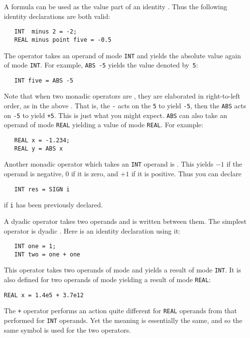 A formula can be used as the value part of an identity
.  Thus the following
identity declarations are both valid:
\begin{verbatim}
   INT  minus 2 = -2;
   REAL minus point five = -0.5
\end{verbatim}
\noindent
The operator  takes an operand of mode \verb|INT| and
yields the absolute value again of mode \verb|INT|. For example,
\verb|ABS -5| yields the value denoted by~\verb|5|:
\begin{verbatim}
   INT five = ABS -5
\end{verbatim}
\noindent
Note that when two monadic operators are
, they are elaborated in
right-to-left order, as in the above
.  That is, the \verb|-| acts
on the \verb|5| to yield \verb|-5|, then the \verb|ABS| acts on
\verb|-5| to yield \verb|+5|. This is just what you might expect.
\verb|ABS| can also take an operand of mode \verb|REAL| yielding a
value of mode \verb|REAL|.  For example:
\begin{verbatim}
   REAL x = -1.234;
   REAL y = ABS x
\end{verbatim}

Another monadic operator which takes an \verb|INT| operand is
. This yields $-1$ if the operand is negative, $0$ if it
is zero, and $+1$ if it is positive.  Thus you can declare
\begin{verbatim}
   INT res = SIGN i
\end{verbatim}
\noindent
if \verb|i| has been previously declared.

A dyadic operator takes two operands and is written between them. The
simplest operator is dyadic .
Here is an identity declaration using it:
\begin{verbatim}
   INT one = 1;
   INT two = one + one
\end{verbatim}
\noindent
This operator takes two operands of mode  and yields a
result of mode \verb|INT|. It is also defined for two operands of
mode  yielding a result of mode \verb|REAL|:
\begin{verbatim}
REAL x = 1.4e5 + 3.7e12
\end{verbatim}
\noindent
The \verb|+| operator performs an action quite different for
\verb|REAL| operands from that performed for \verb|INT| operands. Yet
the meaning is essentially the same, and so the same symbol is used
for the two operators.

